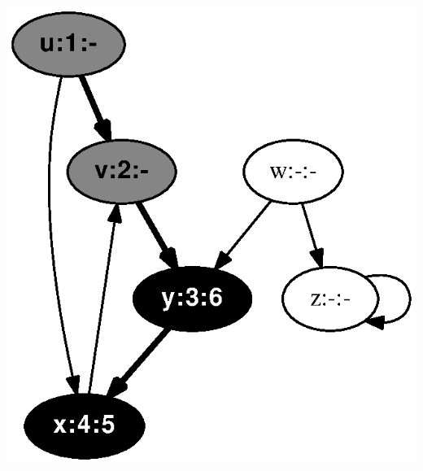 \documentclass{article}
\begin{document}
\vspace{1em}
\includegraphics[height=.3\textheight]{clrs_example_dfs_06.eps}
\vspace{1em}
\end{document}
